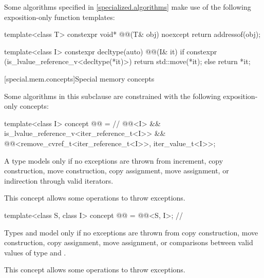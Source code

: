 \pnum
Some algorithms specified in \ref{specialized.algorithms}
make use of the following exposition-only function templates:
\begin{codeblock}
template<class T>
  constexpr void* @@(T& obj) noexcept {
    return addressof(obj);
  }

template<class I>
  constexpr decltype(auto) @@(I& it) {
    if constexpr (is_lvalue_reference_v<decltype(*it)>)
      return std::move(*it);
    else
      return *it;
  }
\end{codeblock}

[special.mem.concepts]{Special memory concepts}

\pnum
Some algorithms in this subclause are constrained with the following
exposition-only concepts:

\begin{itemdecl}
template<class I>
concept @@ = // \expos
  @@<I> &&
  is_lvalue_reference_v<iter_reference_t<I>> &&
  @@<remove_cvref_t<iter_reference_t<I>>, iter_value_t<I>>;
\end{itemdecl}

\begin{itemdescr}
\pnum
A type  models  only if
no exceptions are thrown from increment,
copy construction, move construction,
copy assignment, move assignment,
or indirection through valid iterators.

\pnum
\begin{note}
This concept allows some 
operations to throw exceptions.
\end{note}
\end{itemdescr}

\begin{itemdecl}
template<class S, class I>
concept @@ = @@<S, I>; // \expos
\end{itemdecl}

\begin{itemdescr}
\pnum
Types  and  model 
only if no exceptions are thrown from copy construction, move construction,
copy assignment, move assignment, or comparisons between
valid values of type  and .

\pnum
\begin{note}
This concept allows some 
operations to throw exceptions.
\end{note}
\end{itemdescr}

